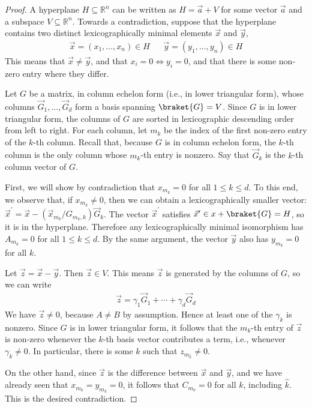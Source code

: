 \begin{proof}
	A hyperplane $H\subseteq \mathbb R^n$ can be written as $H=\vec a+V$ for some vector $\vec a$ and a subspace $V\subseteq \mathbb R^n$.
	Towards a contradiction, suppose that the hyperplane contains two distinct lexicographically minimal elements $\vec x$ and $\vec y$,
	\begin{align}
		\vec x=(x_1,\ldots, x_n)\in H & & \vec y = (y_1,\ldots, y_n)\in H
	\end{align}
	This means that $\vec x\ne \vec y$, and that $x_i=0\iff y_i=0$, and that there is some non-zero entry where they differ.
	
	Let $G$ be a matrix, in column echelon form (i.e., in lower triangular form), whose columns $\vec G_{1},\ldots, \vec G_{d}$ form a basis spanning $\braket{G}=V$.
	Since $G$ is in lower triangular form, the columns of $G$ are sorted in lexicographic descending order from left to right.
	For each column, let $m_k$ be the index of the first non-zero entry of the $k$-th column.
	Recall that, because $G$ is in column echelon form, the $k$-th column is the only column whose $m_k$-th entry is nonzero.
	Say that $\vec G_k$ is the $k$-th column vector of $G$.
	
	First, we will show by contradiction that $x_{m_k}=0$ for all $1\leq k\leq d$.
	To this end, we observe that, if $x_{m_k}\ne 0$, then we can obtain a lexicographically smaller vector: $\vec x^\prime = \vec x - (\vec x_{m_k}/G_{m_k,k}) \vec G_k$.
	The vector $\vec x^\prime$ satisfies $\vec x^\prime\in x+\braket{G}=H$, so it is in the hyperplane.
	Therefore any lexicographically minimal isomorphism has $A_{m_k}=0$ for all $1\leq k\leq d$.
	By the same argument, the vector $\vec y$ also has $y_{m_k}=0$ for all $k$.

	Let $\vec z=\vec x-\vec y$.
	Then $\vec z\in V$.
	This means $\vec z$ is generated by the columns of $G$, so we can write
	\begin{align}
		\vec z=\gamma_1 \vec G_{1} + \cdots + \gamma_d \vec G_d
	\end{align}
	We have $\vec z\ne 0$, because $A\ne B$ by assumption.
	Hence at least one of the $\gamma_k$ is nonzero.
	Since $G$ is in lower triangular form, it follows that the $m_k$-th entry of $\vec z$ is non-zero whenever the $k$-th basis vector contributes a term, i.e., whenever $\gamma_k\ne 0$.
	In particular, there is some $\hat k$ such that $z_{m_{\hat k}}\ne 0$.
	
	On the other hand, since $\vec z$ is the difference between $\vec x$ and $\vec y$, and we have already seen that $x_{m_k}=y_{m_k}=0$, it follows that $C_{m_k}=0$ for all $k$, including $\hat k$.
	This is the desired contradiction.
\end{proof}

